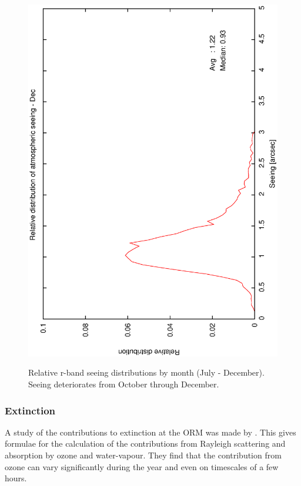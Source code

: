 {{\begin{figure}[htbp]
\begin{center}
{   \includegraphics[scale=0.25, angle=-90]{figures/ecs/corr_see_dist_dec.eps} 
   \label{fig:see_dist_dec}
  }
 \end{center}
 \caption[Relative r-band seeing distributions by month (July - December).]
	 {Relative r-band seeing distributions by month (July - December). Seeing deteriorates from October through December.}
\label{fig:see_dist_juldec}
\end{figure}

\subsubsection{Extinction}
A study of the contributions to extinction at the ORM was made by \citet{lapalma31}. This gives formulae for the calculation of the contributions from Rayleigh scattering and absorption by ozone and water-vapour. They find that the contribution from ozone can vary significantly during the year and even on timescales of a few hours.

}}
